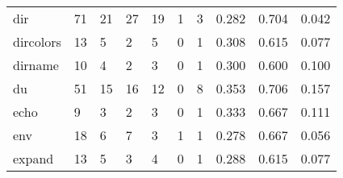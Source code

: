 \begin{longtable}{lp{1.3cm}p{1.3cm}p{1.3cm}p{1.3cm}p{1.3cm}p{1.3cm}p{1.3cm}p{1.3cm}p{1.3cm}}
dir       &                     71 &                                            21 &                                           27 &                                          19 &                                            1 &                                          3 &                                0.282 &                                  0.704 &                                0.042 \\
dircolors &                     13 &                                             5 &                                            2 &                                           5 &                                            0 &                                          1 &                                0.308 &                                  0.615 &                                0.077 \\
dirname   &                     10 &                                             4 &                                            2 &                                           3 &                                            0 &                                          1 &                                0.300 &                                  0.600 &                                0.100 \\
du        &                     51 &                                            15 &                                           16 &                                          12 &                                            0 &                                          8 &                                0.353 &                                  0.706 &                                0.157 \\
echo      &                      9 &                                             3 &                                            2 &                                           3 &                                            0 &                                          1 &                                0.333 &                                  0.667 &                                0.111 \\
env       &                     18 &                                             6 &                                            7 &                                           3 &                                            1 &                                          1 &                                0.278 &                                  0.667 &                                0.056 \\
expand    &                     13 &                                             5 &                                            3 &                                           4 &                                            0 &                                          1 &                                0.288 &                                  0.615 &                                0.077 \\

\end{longtable}
